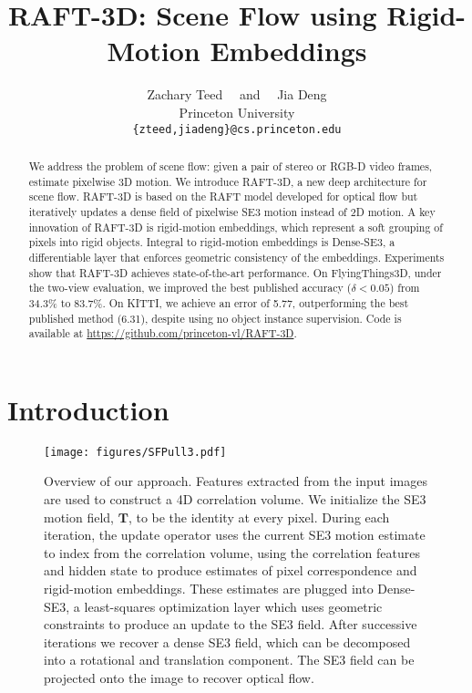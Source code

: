 \documentclass[final]{cvpr}
\begin{document}
\title{RAFT-3D: Scene Flow using Rigid-Motion Embeddings}

\author{Zachary Teed \ \ and \ \ Jia Deng \\
Princeton University \\
{\tt\small \{zteed,jiadeng\}@cs.princeton.edu}}

\maketitle

\begin{abstract}
  We address the problem of scene flow: given a pair of stereo or RGB-D video frames, estimate pixelwise 3D motion. We introduce RAFT-3D, a new deep architecture for scene flow. RAFT-3D is based on the RAFT model developed for optical flow but iteratively updates a dense field of pixelwise SE3 motion instead of 2D motion. A key innovation of RAFT-3D is rigid-motion embeddings, which represent a soft grouping of pixels into rigid objects. Integral to rigid-motion embeddings is Dense-SE3, a differentiable layer that enforces geometric consistency of the embeddings. Experiments show that RAFT-3D achieves state-of-the-art performance. On FlyingThings3D, under the two-view evaluation, we improved the best published accuracy ($\delta < 0.05$) from 34.3\% to 83.7\%. On KITTI, we achieve an error of 5.77, outperforming the best published method (6.31), despite using no object instance supervision. Code is available at \url{https://github.com/princeton-vl/RAFT-3D}.
  \end{abstract}


\section{Introduction}

\begin{figure*}
    \centering
    \texttt{[image: figures/SFPull3.pdf]}
    \caption{Overview of our approach. Features extracted from the input images are used to construct a 4D correlation volume. We initialize the SE3 motion field, $\mathbf{T}$, to be the identity at every pixel. During each iteration, the update operator uses the current SE3 motion estimate to index from the correlation volume, using the correlation features and hidden state to produce estimates of pixel correspondence and rigid-motion embeddings. These estimates are plugged into Dense-SE3, a least-squares optimization layer which uses geometric constraints to produce an update to the SE3 field. After successive iterations we recover a dense SE3 field, which can be decomposed into a rotational and translation component. The SE3 field can be projected onto the image to recover optical flow.}
    \label{fig:RAFT3D}
\end{figure*}
\end{document}
